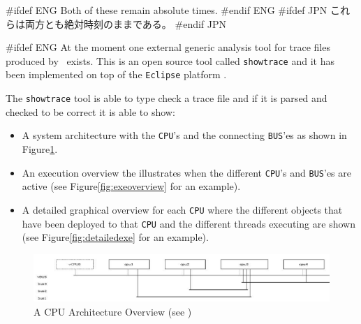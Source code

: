 \documentclass[\pformat,12pt]{article}
\begin{document}
#ifdef ENG
Both of these remain absolute times.
#endif ENG
#ifdef JPN
これらは両方とも絶対時刻のままである。
#endif JPN

#ifdef ENG
At the moment one external generic analysis tool for trace files produced by
\VDMTools\ exists. This is an open source tool called \texttt{showtrace} and
it has been implemented on top of the \texttt{Eclipse} platform 
\cite{Carlson05}. 

The \texttt{showtrace} tool is able to type check a trace file and if it 
is parsed and checked to be correct it is able to show:

\begin{itemize}
\item A system architecture with the \texttt{CPU}'s and the connecting
      \texttt{BUS}'es as shown in Figure\ref{fig:cpuarchitecture}.
\item An execution overview the illustrates when the different 
      \texttt{CPU}'s and \texttt{BUS}'es are active (see 
      Figure\ref{fig:exeoverview} for an example).
\item A detailed graphical overview for each \texttt{CPU} where the
      different objects that have been deployed to that \texttt{CPU} and
      the different threads executing are shown (see 
      Figure\ref{fig:detailedexe} for an example).
\end{itemize}

\begin{figure}
\begin{center}
\includegraphics[width=\textwidth]{cpuarchitecture.png}
\end{center}
\caption{A CPU Architecture Overview (see \cite{VICEGuide-CSK})
\label{fig:cpuarchitecture}}
\end{figure}
\end{document}
